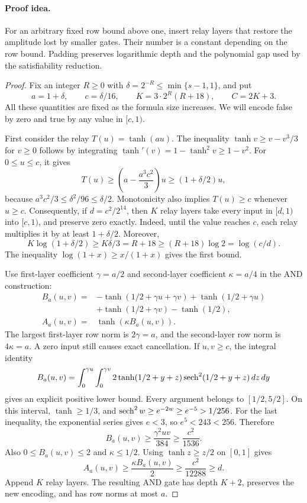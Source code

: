 \paragraph{Proof idea.}
For an arbitrary fixed row bound above one, insert relay layers
that restore the amplitude lost by smaller gates. Their number is a constant
depending on the row bound. Padding preserves logarithmic depth and the
polynomial gap used by the satisfiability reduction.

\begin{proof}
Fix an integer \(R\ge0\) with
\(\delta=2^{-R}\le\min\{s-1,1\}\), and put
\[
 a=1+\delta,\qquad c=\delta/16,\qquad
 K=3\cdot2^R(R+18),\qquad C=2K+3.
\]
All these quantities are fixed as the formula size increases.
We will encode false by zero and true by any value in \([c,1)\).

First consider the relay \(T(u)=\tanh(au)\).
The inequality \(\tanh v\ge v-v^3/3\) for \(v\ge0\)
follows by integrating
\(\tanh'(v)=1-\tanh^2v\ge1-v^2\).
For \(0\le u\le c\), it gives
\[
 T(u)\ge
 \left(a-\frac{a^3c^2}{3}\right)u
 \ge(1+\delta/2)u,
\]
because \(a^3c^2/3\le\delta^2/96\le\delta/2\).
Monotonicity also implies \(T(u)\ge c\) whenever \(u\ge c\).
Consequently, if
\(d=c^2/2^{14}\), then \(K\) relay layers take every input
in \([d,1)\) into \([c,1)\), and preserve zero exactly.
Indeed, until the value reaches \(c\), each relay multiplies it
by at least \(1+\delta/2\).  Moreover,
\[
 K\log(1+\delta/2)\ge K\delta/3=R+18
 \ge(R+18)\log2=\log(c/d).
\]
The inequality \(\log(1+x)\ge x/(1+x)\) gives the first bound.

Use first-layer coefficient \(\gamma=a/2\) and second-layer
coefficient \(\kappa=a/4\) in the AND construction:
\begin{align*}
 B_a(u,v)={}&-\tanh(1/2+\gamma u+\gamma v)
       +\tanh(1/2+\gamma u)\\
       &+\tanh(1/2+\gamma v)-\tanh(1/2),\\
 A_a(u,v)={}&\tanh(\kappa B_a(u,v)).
\end{align*}
The largest first-layer row norm is \(2\gamma=a\), and the
second-layer row norm is \(4\kappa=a\).
A zero input still causes exact cancellation.  If \(u,v\ge c\),
the integral identity
\[
 B_a(u,v)=\int_0^{\gamma u}\int_0^{\gamma v}
 2\tanh(1/2+y+z)\operatorname{sech}^2(1/2+y+z)\,dz\,dy
\]
gives an explicit positive lower bound.  Every argument belongs
to \([1/2,5/2]\).  On this interval,
\(\tanh\ge1/3\), and
\(\operatorname{sech}^2w\ge e^{-2w}\ge e^{-5}>1/256\).
For the last inequality, the exponential series gives \(e<3\),
so \(e^5<243<256\).  Therefore
\[
 B_a(u,v)\ge\frac{\gamma^2uv}{384}
 \ge\frac{c^2}{1536}.
\]
Also \(0\le B_a(u,v)\le2\) and \(\kappa\le1/2\).
Using \(\tanh z\ge z/2\) on \([0,1]\) gives
\[
 A_a(u,v)\ge\frac{\kappa B_a(u,v)}2
 \ge\frac{c^2}{12288}\ge d.
\]
Append \(K\) relay layers.  The resulting AND gate has depth
\(K+2\), preserves the new encoding, and has row norms at most
\(a\).


\end{proof}
